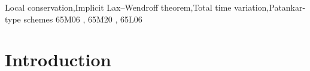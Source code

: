 \documentclass[final,11pt, times, linenumber, nopreprintline]{elsarticle}
\begin{document}
\begin{frontmatter}
\begin{abstract}
%
\end{abstract}
\begin{keyword}
Local conservation\sep Implicit Lax--Wendroff theorem\sep Total time variation\sep Patankar-type schemes
\MSC   65M06 \sep %
65M20 \sep %
65L06 %
\end{keyword}
\end{frontmatter}



\section{Introduction}

\end{document}
